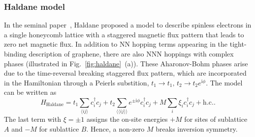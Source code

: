 \subsubsection{Haldane model}
In the seminal paper~\cite{Haldane1988}, Haldane proposed a model to describe spinless electrons in a single honeycomb lattice with a staggered magnetic flux pattern that leads to zero net magnetic flux. In addition to NN hopping terms appearing in the tight-binding description of graphene, there are also NNN hoppings with complex phases (illustrated in Fig.~\ref{fig:haldane}~(a)). These Aharonov-Bohm phases arise due to the time-reversal breaking staggered flux pattern, which are incorporated in the Hamiltonian through a Peierls substition, $t_1 \rightarrow t_1, \, t_2 \rightarrow t_2 e^{\mathrm{i} \phi}$. The model can be written as
\begin{equation}
H_{\mathrm{Haldane}} = t_1 \sum_{\langle ij \rangle} c^{\dagger}_i c_j + t_2 \sum_{\langle \langle i j \rangle \rangle} e^{\pm \mathrm{i} \phi} c^{\dagger}_i c_j  + M \sum_i  \xi_i c^{\dagger}_i c_j +  \mathrm{h. c.}.
\label{eq:haldane}
\end{equation}
The last term with $\xi = \pm 1$ assigns the on-site energies $+M$ for sites of sublattice $A$ and $-M$ for sublattice $B$. Hence, a non-zero $M$ breaks inversion symmetry.


